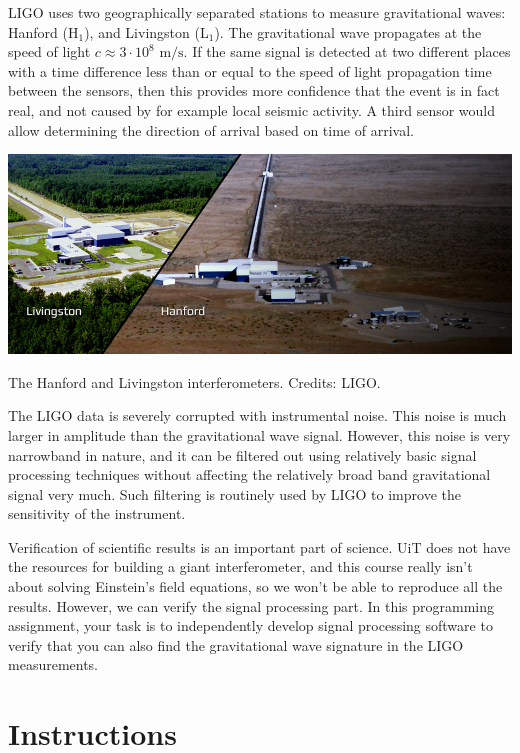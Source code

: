 LIGO uses two geographically separated stations to measure gravitational
waves: Hanford (H$_1$), and Livingston (L$_1$). The gravitational wave
propagates at the speed of light $c\approx 3\cdot 10^8$
$\mathrm{m}/\mathrm{s}$. If the same signal is detected at two
different places with a time difference less than or equal to the
speed of light propagation time between the sensors, then this
provides more confidence that the event is in fact real, and not
caused by for example local seismic activity. A third sensor would
allow determining the direction of arrival based on time of arrival.

\begin{marginfigure}
  \begin{center}
    \includegraphics[width=\textwidth]{Assignments/figures/hanliv.jpg}
  \end{center}
  \caption{The Hanford and Livingston interferometers. Credits: LIGO.}
\end{marginfigure}

The LIGO data is severely corrupted with instrumental noise. This
noise is much larger in amplitude than the gravitational wave
signal. However, this noise is very narrowband in nature, and it can
be filtered out using relatively basic signal processing techniques
without affecting the relatively broad band gravitational signal very
much. Such filtering is routinely used by LIGO to improve the
sensitivity of the instrument.

Verification of scientific results is an important part of
science. UiT does not have the resources for building a giant
interferometer, and this course really isn't about solving Einstein's
field equations, so we won't be able to reproduce all the
results. However, we can verify the signal processing part. In this
programming assignment, your task is to independently develop signal
processing software to verify that you can also find the gravitational
wave signature in the LIGO measurements.

\section{Instructions}

